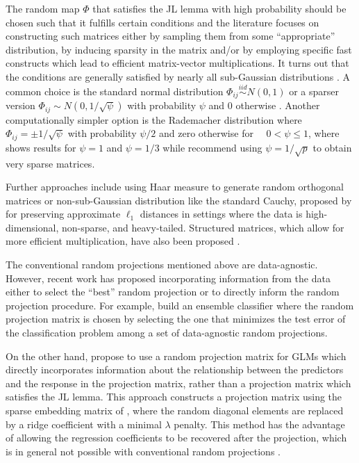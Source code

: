 \documentclass[
  article]{jss}
\begin{document}
The random map \(\Phi\) that satisfies the JL lemma with high
probability should be chosen such that it fulfills certain conditions
\citep[see][]{JohnsonLindenstrauss1984} and the literature focuses on
constructing such matrices either by sampling them from some
``appropriate'' distribution, by inducing sparsity in the matrix and/or
by employing specific fast constructs which lead to efficient
matrix-vector multiplications. It turns out that the conditions are
generally satisfied by nearly all sub-Gaussian distributions
\citep{matouvsek2008variants}. A common choice is the standard normal
distribution \(\Phi_{ij} \overset{iid}{\sim} N(0,1)\)
\citep{FRANKL1988JLSphere} or a sparser version
\(\Phi_{ij}{\sim} N(0,1/\sqrt{\psi})\) with probability \(\psi\) and
\(0\) otherwise \citep{matouvsek2008variants}. Another computationally
simpler option is the Rademacher distribution where
\(\Phi_{ij} =  \pm 1/\sqrt{\psi}\) with probability \(\psi/2\) and zero
otherwise for \(\quad 0<\psi\leq 1\), where \citet{ACHLIOPTAS2003JL}
shows results for \(\psi=1\) and \(\psi=1/3\) while
\citet{LiHastie2006VerySparseRP} recommend using \(\psi=1/\sqrt{p}\) to
obtain very sparse matrices.

Further approaches include using Haar measure to generate random
orthogonal matrices \citep{cannings2017random} or non-sub-Gaussian
distribution like the standard Cauchy, proposed by
\citet{LiHastieChurch2007} for preserving approximate \(\ell_1\)
distances in settings where the data is high-dimensional, non-sparse,
and heavy-tailed. Structured matrices, which allow for more efficient
multiplication, have also been proposed \citep[see
e.g.,][]{ailon2009fast, Clarkson2013LowRankApprox}.

The conventional random projections mentioned above are data-agnostic.
However, recent work has proposed incorporating information from the
data either to select the ``best'' random projection or to directly
inform the random projection procedure. For example,
\citet{cannings2017random} build an ensemble classifier where the random
projection matrix is chosen by selecting the one that minimizes the test
error of the classification problem among a set of data-agnostic random
projections.

On the other hand, \citet{parzer2024glms} propose to use a random
projection matrix for GLMs which directly incorporates information about
the relationship between the predictors and the response in the
projection matrix, rather than a projection matrix which satisfies the
JL lemma. This approach constructs a projection matrix using the sparse
embedding matrix of \citet{Clarkson2013LowRankApprox}, where the random
diagonal elements are replaced by a ridge coefficient with a minimal
\(\lambda\) penalty. This method has the advantage of allowing the
regression coefficients to be recovered after the projection, which is
in general not possible with conventional random projections
\citep{Thanei2017RPforHDR}.
\end{document}
